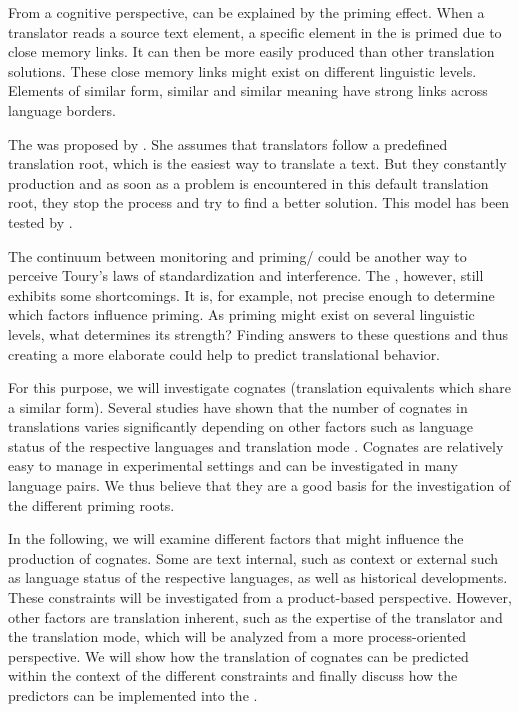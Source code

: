 \documentclass[output=paper]{LSP/langsci}
\begin{document}
From a cognitive perspective,  can be explained by the priming effect. When a translator reads a source text element, a specific element in the  is primed due to close memory links. It can then be more easily produced than other translation solutions. These close memory links might exist on different linguistic levels. Elements of similar form, similar  and similar meaning have strong links across language borders.

The  was proposed by \citet{TirkkonenCondit2005}. She assumes that translators follow a predefined translation root, which is the easiest way to translate a text. But they constantly  production and as soon as a problem is encountered in this default translation root, they stop the  process and try to find a better solution. This model has been tested by \citet{CarlDragsted2012}.

The continuum between monitoring and priming/ could be another way to perceive Toury's laws of standardization and interference. The , however, still exhibits some shortcomings. It is, for example, not precise enough to determine which factors influence priming. As priming might exist on several linguistic levels, what determines its strength? Finding answers to these questions and thus creating a more elaborate  could help to predict translational behavior.

For this purpose, we will investigate cognates (translation equivalents which share a similar form). Several studies have shown that the number of cognates in translations varies significantly depending on other factors such as language status of the respective languages \citep{VintarHansenSchirra2005} and translation mode . Cognates are relatively easy to manage in experimental settings and can be investigated in many language pairs. We thus believe that they are a good basis for the investigation of the different priming roots.

In the following, we will examine different factors that might influence the production of cognates. Some are text internal, such as context or external such as language status of the respective languages, as well as historical developments. These constraints will be investigated from a product-based perspective. However, other factors are translation inherent, such as the expertise of the translator and the translation mode, which will be analyzed from a more process-oriented perspective. We will show how the translation of cognates can be predicted within the context of the different constraints and finally discuss how the predictors can be implemented into the .
\end{document}
